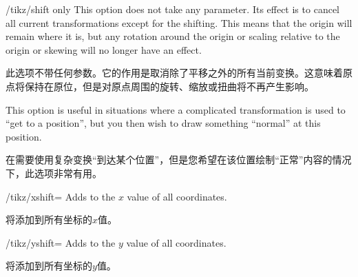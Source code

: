 \begin{key}{/tikz/shift only}
    This option does not take any parameter. Its effect is to cancel all
    current transformations except for the shifting. This means that the origin
    will remain where it is, but any rotation around the origin or scaling
    relative to the origin or skewing will no longer have an effect.

    此选项不带任何参数。它的作用是取消除了平移之外的所有当前变换。这意味着原点将保持在原位，但是对原点周围的旋转、缩放或扭曲将不再产生影响。

    This option is useful in situations where a complicated transformation is
    used to ``get to a position'', but you then wish to draw something
    ``normal'' at this position.
    
    在需要使用复杂变换“到达某个位置”，但是您希望在该位置绘制“正常”内容的情况下，此选项非常有用。


\begin{codeexample}[]
\end{codeexample}
\end{key}

\begin{key}{/tikz/xshift=}
    Adds  to the $x$ value of all coordinates.
    
    将添加到所有坐标的$x$值。


\begin{codeexample}[]
\end{codeexample}
\end{key}

\begin{key}{/tikz/yshift=}
    Adds  to the $y$ value of all coordinates.

    将添加到所有坐标的$y$值。

\end{key}

